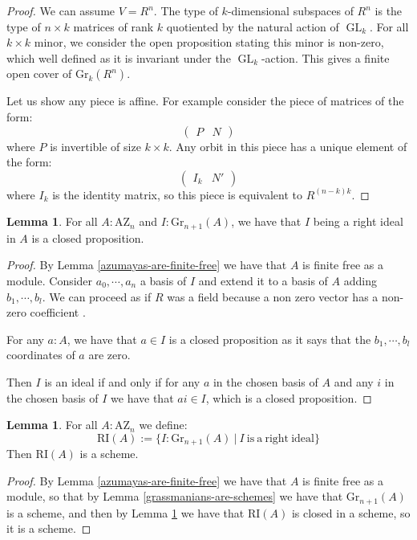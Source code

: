 \documentclass[10pt,a4paper]{article}
\theoremstyle{definition}
\newtheorem{lemma}[theorem]{Lemma}
\newcommand{\Gr}{\mathrm{Gr}}
\DeclareMathOperator{\GL}{GL}
\newcommand{\RI}{\mathrm{RI}}
\newcommand{\AZ}{\mathrm{AZ}}
\begin{document}
\begin{proof}
We can assume $V=R^n$. The type of $k$-dimensional subspaces of $R^n$ is the type of $n\times k$ matrices of rank $k$ quotiented by the natural action of $\GL_k$. For all $k\times k$ minor, we consider the open proposition stating this minor is non-zero, which well defined as it is invariant under the $\GL_k$-action. This gives a finite open cover of $\Gr_k(R^n)$.

Let us show any piece is affine. For example consider the piece of matrices of the form:
\[\begin{pmatrix}
P & N
\end{pmatrix}\]
where $P$ is invertible of size $k\times k$. Any orbit in this piece has a unique element of the form:
\[\begin{pmatrix}
I_k & N'
\end{pmatrix}\]
where $I_k$ is the identity matrix, so this piece is equivalent to $R^{(n-k)k}$.
\end{proof}

\begin{lemma}\label{being-ideal-in-azumaya-closed}
For all $A:\AZ_n$ and $I:\Gr_{n+1}(A)$, we have that $I$ being a right ideal in $A$ is a closed proposition.
\end{lemma}

\begin{proof}
By Lemma \ref{azumayas-are-finite-free} we have that $A$ is finite free as a module. Consider $a_0,\cdots,a_n$ a basis of $I$ and extend it to a basis of $A$ adding $b_1,\cdots,b_l$. We can proceed as if $R$ was a field because a non zero vector has a non-zero coefficient \cite{draft}.

For any $a:A$, we have that $a\in I$ is a closed proposition as it says that the $b_1,\cdots,b_l$ coordinates of $a$ are zero. 

Then $I$ is an ideal if and only if for any $a$ in the chosen basis of $A$ and any $i$ in the chosen basis of $I$ we have that $ai\in I$, which is a closed proposition.
\end{proof}

\begin{lemma}\label{severi-brauer-are-schemes}
For all $A:\AZ_n$ we define:
\[\RI(A) := \{I:\Gr_{n+1}(A)\ |\ I\ \mathrm{is\ a\ right\ ideal}\}\]
Then $\RI(A)$ is a scheme.
\end{lemma}

\begin{proof}
By Lemma \ref{azumayas-are-finite-free} we have that $A$ is finite free as a module, so that by Lemma \ref{grassmanians-are-schemes} we have that $\Gr_{n+1}(A)$ is a scheme, and then by Lemma \ref{being-ideal-in-azumaya-closed} we have that $\RI(A)$ is closed in a scheme, so it is a scheme.
\end{proof}
\end{document}
